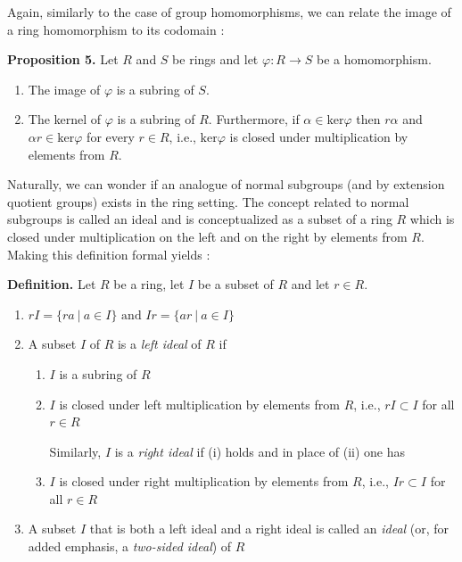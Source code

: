 \documentclass[11pt, reqno]{amsart}
\theoremstyle{plain}
\theoremstyle{definition}
\theoremstyle{example}
\begin{document}
Again, similarly to the case of group homomorphisms, we can relate the image of a ring homomorphism to its codomain \cite[\S 7.3, p. 239]{dummit}:
\par
\textbf{Proposition 5.} Let $R$ and $S$ be rings and let $\varphi: R \to S$ be a homomorphism.
\begin{enumerate}
\item The image of $\varphi$ is a subring of $S$.

\item The kernel of $\varphi$ is a subring of $R$. Furthermore, if $\alpha \in \text{ker}\varphi$ then $r\alpha$ and $\alpha r \in \text{ker} \varphi$ for every $r \in R$, i.e., $\text{ker} \varphi$ is closed under multiplication by elements from $R$.

\end{enumerate}

Naturally, we can wonder if an analogue of normal subgroups (and by extension quotient groups) exists in the ring setting. The concept related to normal subgroups is called an ideal and is conceptualized as a subset of a ring $R$ which is closed under multiplication on the left and on the right by elements from $R$. Making this definition formal yields \cite[\S 7.3, p. 242]{dummit}:

\par
\textbf{Definition.} Let $R$ be a ring, let $I$ be a subset of $R$ and let $r \in R$.
\begin{enumerate}
\item $rI = \{ra \ | \ a \in I\} \text{  and  } Ir = \{ar \ | \ a \in I\}$

\item A subset $I$ of $R$ is a \textit{left ideal} of $R$ if
\begin{enumerate}[label=(\roman*)]

\item $I$ is a subring of $R$

\item $I$ is closed under left multiplication by elements from $R$, i.e., $rI \subset I$ for all $r \in R$

Similarly, $I$ is a \textit{right ideal} if (i) holds and in place of (ii) one has
\item $I$ is closed under right multiplication by elements from $R$, i.e., $Ir \subset I$ for all $r \in R$
\end{enumerate}

\item A subset $I$ that is both a left ideal and a right ideal is called an \textit{ideal} (or, for added emphasis, a \textit{two-sided ideal}) of $R$
\end{enumerate}
\end{document}
